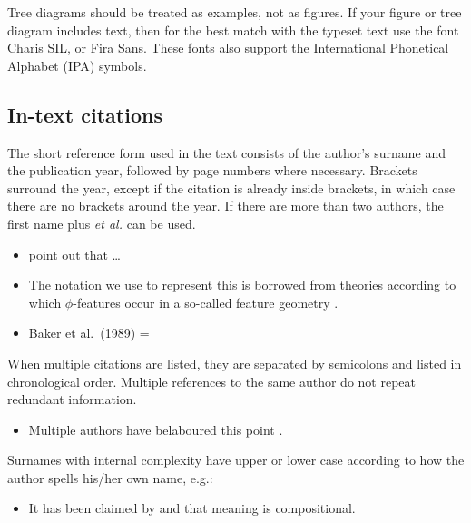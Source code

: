 \documentclass[]{glossa}
\providecommand{\tightlist}{%
  \setlength{\itemsep}{0pt}\setlength{\parskip}{0pt}}
\begin{document}
Tree diagrams should be treated as examples, not as figures. If your
figure or tree diagram includes text, then for the best match with the
typeset text use the font
\href{https://software.sil.org/charis/download/}{Charis SIL}, or
\href{https://www.fontsquirrel.com/fonts/fira-sans}{Fira Sans}. These
fonts also support the International Phonetical Alphabet (IPA) symbols.

\hypertarget{in-text-citations}{%
\subsection{In-text citations}\label{in-text-citations}}

The short reference form used in the text consists of the author's
surname and the publication year, followed by page numbers where
necessary. Brackets surround the year, except if the citation is already
inside brackets, in which case there are no brackets around the year. If
there are more than two authors, the first name plus \emph{et al.} can
be used.

\begin{itemize}
\item
  \citet[514]{murray:1983} point out that \ldots{}
\item
  The notation we use to represent this is borrowed from theories
  according to which \(\phi\)-features occur in a so-called feature
  geometry \citep[ 248-250]{mccarthy:1999}.
\item
  Baker et al.~(1989) = \citet{baker:1989}
\end{itemize}

When multiple citations are listed, they are separated by semicolons and
listed in chronological order. Multiple references to the same author do
not repeat redundant information.

\begin{itemize}
\tightlist
\item
  Multiple authors have belaboured this point
  \citep{chomsky:1981, chomsky:1986a, chomsky:1986, iverson:1989, casali:1998a, blevins:2004, franks:2005}.
\end{itemize}

Surnames with internal complexity have upper or lower case according to
how the author spells his/her own name, e.g.:

\begin{itemize}
\tightlist
\item
  It has been claimed by \citet{swart:1998} and \citet{belder:2011} that
  meaning is compositional.
\end{itemize}
\end{document}

